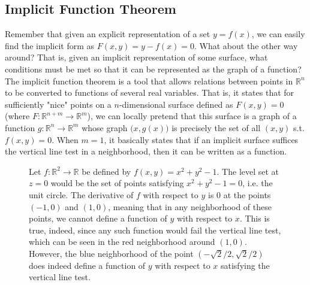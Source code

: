 \subsection{Implicit Function Theorem}

  Remember that given an explicit representation of a set $y = f(x)$, we can easily find the implicit form as $F(x, y) = y - f(x) = 0$. What about the other way around? That is, given an implicit representation of some surface, what conditions must be met so that it can be represented as the graph of a function? The implicit function theorem is a tool that allows relations between points in $\mathbb{R}^n$ to be converted to functions of several real variables. That is, it states that for sufficiently "nice" points on a $n$-dimensional surface defined as $F(x, y) = 0$ (where $F: \mathbb{R}^{n+m} \to \mathbb{R}^m$), we can locally pretend that this surface is a graph of a function $g: \mathbb{R}^n \to \mathbb{R}^m$ whose graph $\big(x, g(x)\big)$ is precisely the set of all $(x, y)$ s.t. $f(x, y) = 0$. When $m = 1$, it basically states that if an implicit surface suffices the vertical line test in a neighborhood, then it can be written as a function. 

	\begin{figure}[H]
		\centering 
		\caption{Let $f: \mathbb{R}^2 \to \mathbb{R}$ be defined by $f(x, y) = x^2 + y^2 - 1$. The level set at $z = 0$ would be the set of points satisfying $x^2 + y^2 - 1 = 0$, i.e. the unit circle. The derivative of $f$ with respect to $y$ is $0$ at the points $(-1,0)$ and $(1,0)$, meaning that in any neighborhood of these points, we cannot define a function of $y$ with respect to $x$. This is true, indeed, since any such function would fail the vertical line test, which can be seen in the red neighborhood around $(1,0)$. However, the blue neighborhood of the point $(-\sqrt{2}/2, \sqrt{2}/2)$ does indeed define a function of $y$ with respect to $x$ satisfying the vertical line test. } 
		\label{fig:unit_circle}
	\end{figure}

